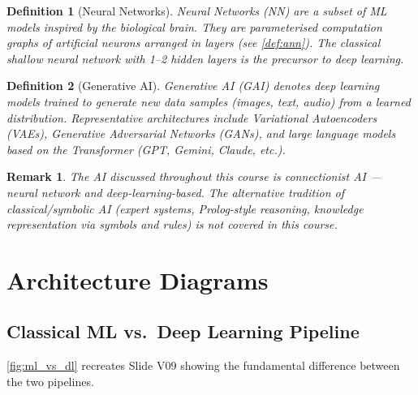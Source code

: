 \documentclass[12pt,a4paper]{article}
\newtheorem{definition}{Definition}[section]
\newtheorem{remark}{Remark}[section]
\begin{document}
\begin{definition}[Neural Networks]
\label{def:nn}
\emph{Neural Networks} (NN) are a subset of ML models inspired by the
biological brain.  They are parameterised computation graphs of artificial
neurons arranged in layers (see \cref{def:ann}).  The classical shallow
neural network with 1--2 hidden layers is the precursor to deep learning.
\end{definition}

\begin{definition}[Generative AI]
\label{def:gai}
\emph{Generative AI} (GAI) denotes deep learning models trained to generate
new data samples (images, text, audio) from a learned distribution.
Representative architectures include Variational Autoencoders (VAEs),
Generative Adversarial Networks (GANs), and large language models based on
the Transformer (GPT, Gemini, Claude, etc.).
\end{definition}

\begin{remark}
\label{rem:connectionism}
The AI discussed throughout this course is \emph{connectionist AI} — neural
network and deep-learning-based.  The alternative tradition of
\emph{classical/symbolic AI} (expert systems, Prolog-style reasoning,
knowledge representation via symbols and rules) is not covered in this course.
\end{remark}

\section{Architecture Diagrams}
\label{sec:diagrams}

\subsection{Classical ML vs.\ Deep Learning Pipeline}
\label{subsec:ml_dl_diagram}

\cref{fig:ml_vs_dl} recreates Slide V09 showing the fundamental difference
between the two pipelines.
\end{document}
